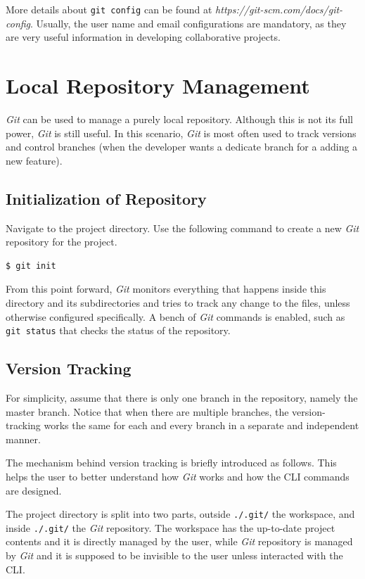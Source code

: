 More details about \verb|git config| can be found at \textit{https://git-scm.com/docs/git-config}. Usually, the user name and email configurations are mandatory, as they are very useful information in developing collaborative projects.

\section{Local Repository Management}

\textit{Git} can be used to manage a purely local repository. Although this is not its full power, \textit{Git} is still useful. In this scenario, \textit{Git} is most often used to track versions and control branches (when the developer wants a dedicate branch for a adding a new feature).

\subsection{Initialization of Repository}

Navigate to the project directory. Use the following command to create a new \textit{Git} repository for the project.
\begin{lstlisting}
$ git init
\end{lstlisting}
From this point forward, \textit{Git} monitors everything that happens inside this directory and its subdirectories and tries to track any change to the files, unless otherwise configured specifically. A bench of \textit{Git} commands is enabled, such as \verb|git status| that checks the status of the repository.

\subsection{Version Tracking}

For simplicity, assume that there is only one branch in the repository, namely the master branch. Notice that when there are multiple branches, the version-tracking works the same for each and every branch in a separate and independent manner.

The mechanism behind version tracking is briefly introduced as follows. This helps the user to better understand how \textit{Git} works and how the CLI commands are designed.

The project directory is split into two parts, outside \verb|./.git/| the workspace, and inside \verb|./.git/| the \textit{Git} repository. The workspace has the up-to-date project contents and it is directly managed by the user, while \textit{Git} repository is managed by \textit{Git} and it is supposed to be invisible to the user unless interacted with the CLI. 

